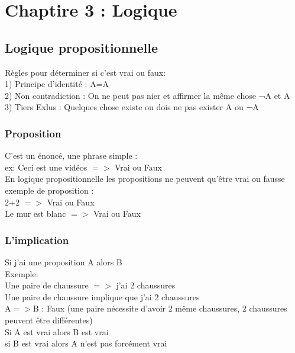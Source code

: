 \newpage

\chapter{Chaptire 3 : Logique}

\section{Logique propositionnelle}
\vspace{5mm} %

Règles pour déterminer si c'est vrai ou faux: \\

1) Principe d'identité : A=A \\

2) Non contradiction : On ne peut pas nier et affirmer la même chose ¬A et A \\

3) Tiers Exlus : Quelques chose existe ou dois ne pas exister A ou ¬A \\


\subsection{Proposition}
\vspace{5mm} %

C'est un énoncé, une phrase simple : \\
ex: Ceci est une vidéos $=>$ Vrai ou Faux \\

En logique propositionnelle les propositions ne peuvent qu'être vrai ou fausse \\

exemple de proposition : \\
2+2 $=>$ Vrai ou Faux \\
Le mur est blanc $=>$ Vrai ou Faux \\

\subsection{L'implication}
\vspace{5mm} %

Si j'ai une proposition A alors B \\

Exemple: \\
Une paire de chaussure $=>$ j'ai 2 chaussures \\
Une paire de chaussure implique que j'ai 2 chaussures \\
A$=>$B : Faux (une paire nécessite d'avoir 2 même chaussures, 2 chaussures peuvent être différentes)\\
Si A est vrai alors B est vrai \\
si B est vrai alors A n'est pas forcément vrai \\

